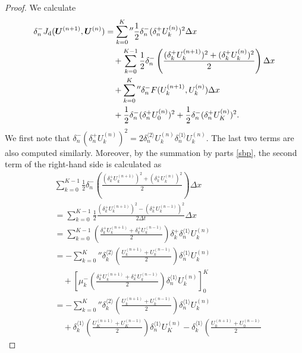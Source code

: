 \documentclass[dvipdfmx-if-dvi,autodetect-engine,ja=standard]{amsart}
\numberwithin{equation}{section} %
\def\vect#1{\mbox{\boldmath $#1$}} %
\begin{document}
\begin{proof}
We calculate
\begin{align}
    \delta_n^- J_{\mathrm{d}}(\vect{U}^{(n+1)}, \vect{U}^{(n)})
    &=
    \sum_{k=0}^K{}'' \frac{1}{2} \delta_n^- (\delta_n^+ U_k^{(n)})^2 \Delta x \\
    &\quad +
    \sum_{k=0}^{K-1} \frac{1}{2} \delta_n^-
    \left(
        \frac{(\delta_k^+ U_k^{(n+1)})^2 + (\delta_k^+ U_k^{(n)})^2}{2}
    \right)
    \Delta x \\
    &\quad + \sum_{k=0}^K{}'' \delta_n^- F(U_k^{(n+1)},U_k^{(n)}) \Delta x \\
    &\quad + 
    \frac{1}{2} \delta_n^- (\delta_n^+ U_0^{(n)})^2
    + \frac{1}{2} \delta_n^- (\delta_n^+ U_K^{(n)})^2.
\end{align}
We first note that
$\delta_n^- (\delta_n^+ U_k^{(n)})^2
= 2 \delta_n^{\langle 2\rangle}U_k^{(n)} \delta_n^{\langle 1 \rangle} U_k^{(n)}$.
The last two terms are also computed similarly.
Moreover, by the summation by parts \eqref{sbp},
the second term of the right-hand side is
calculated as
\begin{align}
    &\sum_{k=0}^{K-1} \frac{1}{2} \delta_n^-
    \left(
        \frac{(\delta_k^+ U_k^{(n+1)})^2 + (\delta_k^+ U_k^{(n)})^2}{2}
    \right)
    \Delta x \\
    &=
    \sum_{k=0}^{K-1} \frac{1}{2}
    \frac{(\delta_k^+ U_k^{(n+1)})^2 - (\delta_k^+ U_k^{(n-1)})^2}{2\Delta t} \Delta x \\
    &=
    \sum_{k=0}^{K-1} 
    \left(
    \frac{\delta_k^+ U_k^{(n+1)}+\delta_k^+ U_k^{(n-1)}}{2}
    \right)
    \delta_k^+ \delta_n^{\langle 1 \rangle} U_k^{(n)} \\
    &=
    - \sum_{k=0}^{K}{}''
        \delta_k^{\langle 2 \rangle}
        \left(
    \frac{U_k^{(n+1)} + U_k^{(n-1)}}{2}
    \right)
    \delta_n^{\langle 1 \rangle} U_k^{(n)} \\
    &\quad
    + \left[
    \mu_k^- \left(
    \frac{\delta_k^+ U_k^{(n+1)}+\delta_k^+ U_k^{(n-1)}}{2}
    \right)
    \delta_n^{\langle 1 \rangle} U_k^{(n)}
    \right]_{0}^K \\
    &=
    - \sum_{k=0}^{K}{}''
        \delta_k^{\langle 2 \rangle}
        \left(
    \frac{U_k^{(n+1)} + U_k^{(n-1)}}{2}
    \right)
    \delta_n^{\langle 1 \rangle} U_k^{(n)} \\
    &\quad
    + \delta_k^{\langle 1 \rangle}
    \left(
    \frac{U_K^{(n+1)} + U_K^{(n-1)}}{2}
    \right)
    \delta_n^{\langle 1 \rangle} U_K^{(n)}
    - \delta_k^{\langle 1 \rangle}
    \left(
    \frac{U_0^{(n+1)} + U_0^{(n-1)}}{2}

\end{align}
\end{proof}
\end{document}
